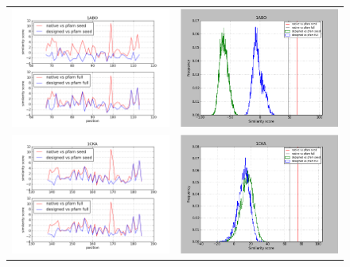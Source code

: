 \documentclass[a4paper,12pt]{article}
\begin{document}
   \begin{figure}[t]
     \centering
     \begin{tabular}{cc}
       \includegraphics[width=8.45cm]{gen_08032012/1ABO/ph/graph_simil_bypos.png} &
       \includegraphics[width=8.45cm]{gen_08032012/1ABO/ph/graph_simil_byseq.png} \\
       \includegraphics[width=8.45cm]{gen_08032012/1CKA/ph/graph_simil_bypos.png} &
       \includegraphics[width=8.45cm]{gen_08032012/1CKA/ph/graph_simil_byseq.png} \\

\end{tabular}
\end{figure}
\end{document}
